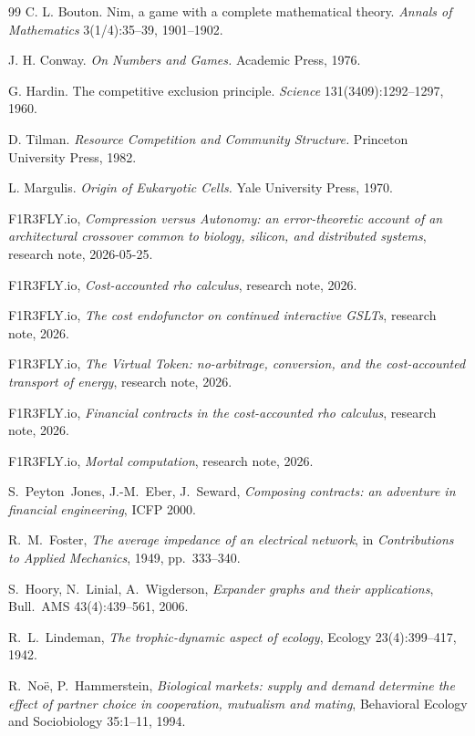 \begin{thebibliography}{99}
C. L. Bouton. Nim, a game with a complete mathematical theory. \emph{Annals of Mathematics} 3(1/4):35--39, 1901--1902.

J. H. Conway. \emph{On Numbers and Games.} Academic Press, 1976.

G. Hardin. The competitive exclusion principle. \emph{Science} 131(3409):1292--1297, 1960.

D. Tilman. \emph{Resource Competition and Community Structure.} Princeton University Press, 1982.

L. Margulis. \emph{Origin of Eukaryotic Cells.} Yale University Press, 1970.

F1R3FLY.io, \emph{Compression versus Autonomy: an error-theoretic account of an architectural crossover common to biology, silicon, and distributed systems}, research note, 2026-05-25.

F1R3FLY.io, \emph{Cost-accounted rho calculus}, research note, 2026.

F1R3FLY.io, \emph{The cost endofunctor on continued interactive GSLTs}, research note, 2026.

F1R3FLY.io, \emph{The Virtual Token: no-arbitrage, conversion, and the cost-accounted transport of energy}, research note, 2026.

F1R3FLY.io, \emph{Financial contracts in the cost-accounted rho calculus}, research note, 2026.

F1R3FLY.io, \emph{Mortal computation}, research note, 2026.

S.~Peyton~Jones, J.-M.~Eber, J.~Seward, \emph{Composing contracts: an adventure in financial engineering}, ICFP 2000.

R.~M.~Foster, \emph{The average impedance of an electrical network}, in \emph{Contributions to Applied Mechanics}, 1949, pp.~333--340.

S.~Hoory, N.~Linial, A.~Wigderson, \emph{Expander graphs and their applications}, Bull.\ AMS 43(4):439--561, 2006.

R.~L.~Lindeman, \emph{The trophic-dynamic aspect of ecology}, Ecology 23(4):399--417, 1942.

R.~No\"e, P.~Hammerstein, \emph{Biological markets: supply and demand determine the effect of partner choice in cooperation, mutualism and mating}, Behavioral Ecology and Sociobiology 35:1--11, 1994.


\end{thebibliography}
